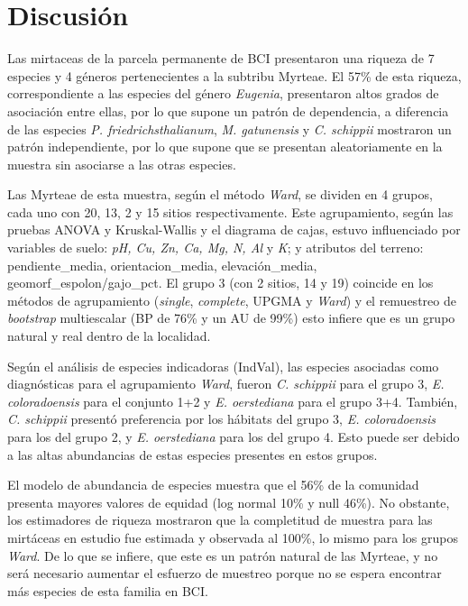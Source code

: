 \documentclass[11pt,]{article}
\begin{document}
\section{Discusión}\label{discusiuxf3n}

Las mirtaceas de la parcela permanente de BCI presentaron una riqueza de
7 especies y 4 géneros pertenecientes a la subtribu Myrteae. El 57\% de
esta riqueza, correspondiente a las especies del género \emph{Eugenia},
presentaron altos grados de asociación entre ellas, por lo que supone un
patrón de dependencia, a diferencia de las especies \emph{P.
friedrichsthalianum}, \emph{M. gatunensis} y \emph{C. schippii}
mostraron un patrón independiente, por lo que supone que se presentan
aleatoriamente en la muestra sin asociarse a las otras especies.

Las Myrteae de esta muestra, según el método \emph{Ward}, se dividen en
4 grupos, cada uno con 20, 13, 2 y 15 sitios respectivamente. Este
agrupamiento, según las pruebas ANOVA y Kruskal-Wallis y el diagrama de
cajas, estuvo influenciado por variables de suelo: \emph{pH, Cu, Zn, Ca,
Mg, N, Al} y \emph{K}; y atributos del terreno: pendiente\_media,
orientacion\_media, elevación\_media, geomorf\_espolon/gajo\_pct. El
grupo 3 (con 2 sitios, 14 y 19) coincide en los métodos de agrupamiento
(\emph{single}, \emph{complete}, UPGMA y \emph{Ward}) y el remuestreo de
\emph{bootstrap} multiescalar (BP de 76\% y un AU de 99\%) esto infiere
que es un grupo natural y real dentro de la localidad.

Según el análisis de especies indicadoras (IndVal), las especies
asociadas como diagnósticas para el agrupamiento \emph{Ward}, fueron
\emph{C. schippii} para el grupo 3, \emph{E. coloradoensis} para el
conjunto 1+2 y \emph{E. oerstediana} para el grupo 3+4. También,
\emph{C. schippii} presentó preferencia por los hábitats del grupo 3,
\emph{E. coloradoensis} para los del grupo 2, y \emph{E. oerstediana}
para los del grupo 4. Esto puede ser debido a las altas abundancias de
estas especies presentes en estos grupos.

El modelo de abundancia de especies muestra que el 56\% de la comunidad
presenta mayores valores de equidad (log normal 10\% y null 46\%). No
obstante, los estimadores de riqueza mostraron que la completitud de
muestra para las mirtáceas en estudio fue estimada y observada al 100\%,
lo mismo para los grupos \emph{Ward}. De lo que se infiere, que este es
un patrón natural de las Myrteae, y no será necesario aumentar el
esfuerzo de muestreo porque no se espera encontrar más especies de esta
familia en BCI.
\end{document}
